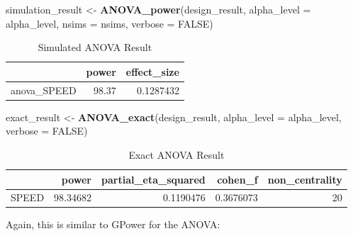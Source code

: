 \documentclass[
]{book}
\newenvironment{Shaded}{\begin{snugshade}}{\end{snugshade}}
\newcommand{\DataTypeTok}[1]{\textcolor[rgb]{0.13,0.29,0.53}{#1}}
\newcommand{\KeywordTok}[1]{\textcolor[rgb]{0.13,0.29,0.53}{\textbf{#1}}}
\newcommand{\NormalTok}[1]{#1}
\newcommand{\OtherTok}[1]{\textcolor[rgb]{0.56,0.35,0.01}{#1}}
\newcommand{\StringTok}[1]{\textcolor[rgb]{0.31,0.60,0.02}{#1}}
\begin{document}
\begin{Shaded}
\begin{Highlighting}[]
\NormalTok{simulation_result <-}\StringTok{ }\KeywordTok{ANOVA_power}\NormalTok{(design_result, }
                                 \DataTypeTok{alpha_level =}\NormalTok{ alpha_level, }
                                 \DataTypeTok{nsims =}\NormalTok{ nsims,}
                                 \DataTypeTok{verbose =} \OtherTok{FALSE}\NormalTok{)}
\end{Highlighting}
\end{Shaded}

\begin{table}[!h]

\caption{\label{tab:unnamed-chunk-351}Simulated ANOVA Result}
\centering
\begin{tabular}[t]{l|r|r}
\hline
  & power & effect\_size\\
\hline
anova\_SPEED & 98.37 & 0.1287432\\
\hline
\end{tabular}
\end{table}

\begin{Shaded}
\begin{Highlighting}[]
\NormalTok{exact_result <-}\StringTok{ }\KeywordTok{ANOVA_exact}\NormalTok{(design_result,}
                            \DataTypeTok{alpha_level =}\NormalTok{ alpha_level,}
                            \DataTypeTok{verbose =} \OtherTok{FALSE}\NormalTok{)}
\end{Highlighting}
\end{Shaded}

\begin{table}[!h]

\caption{\label{tab:unnamed-chunk-353}Exact ANOVA Result}
\centering
\begin{tabular}[t]{l|r|r|r|r}
\hline
  & power & partial\_eta\_squared & cohen\_f & non\_centrality\\
\hline
SPEED & 98.34682 & 0.1190476 & 0.3676073 & 20\\
\hline
\end{tabular}
\end{table}

Again, this is similar to GPower for the ANOVA:
\end{document}
